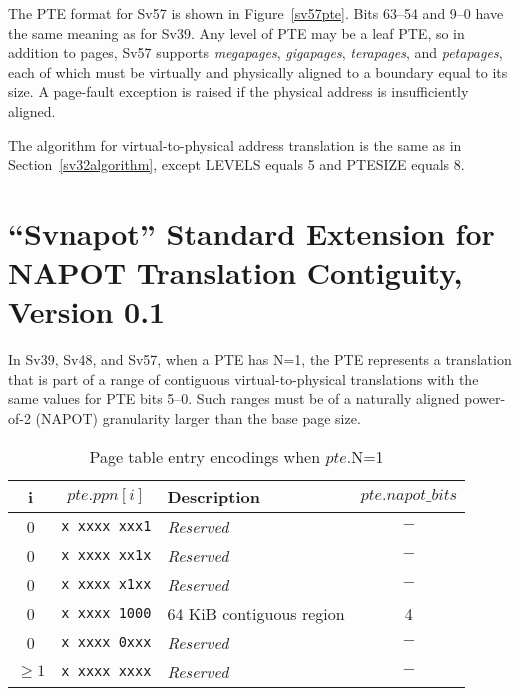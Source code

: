 The PTE format for Sv57 is shown in Figure~\ref{sv57pte}.  Bits 63--54 and 9--0
have the same meaning as for Sv39.  Any level of PTE may be a leaf
PTE, so in addition to  pages, Sv57 supports
 {\em megapages},  {\em gigapages},
 {\em terapages}, and  {\em petapages},
each of which must be virtually and physically aligned to a boundary equal
to its size.  A page-fault exception is raised if the physical address is
insufficiently aligned.

The algorithm for virtual-to-physical address translation is the same
as in Section~\ref{sv32algorithm}, except LEVELS equals 5 and PTESIZE
equals 8.

\chapter{``Svnapot'' Standard Extension for NAPOT Translation Contiguity, Version 0.1}
\label{svnapot}

In Sv39, Sv48, and Sv57, when a PTE has N=1, the PTE represents a
translation that is part of a range of contiguous virtual-to-physical
translations with the same values for PTE bits 5--0.  Such ranges must be of a
naturally aligned power-of-2 (NAPOT) granularity larger than the base page
size.

\begin{table*}[h!]
\begin{center}
\begin{tabular}{|c|c||l|c|}
\hline
i        & $pte.ppn[i]$      & Description              & $pte.napot\_bits$ \\
\hline
0        & {\tt x~xxxx~xxx1} & {\em Reserved}           & $-$ \\
0        & {\tt x~xxxx~xx1x} & {\em Reserved}           & $-$ \\
0        & {\tt x~xxxx~x1xx} & {\em Reserved}           & $-$ \\
0        & {\tt x~xxxx~1000} & 64 KiB contiguous region & 4   \\
0        & {\tt x~xxxx~0xxx} & {\em Reserved}           & $-$ \\
$\geq 1$ & {\tt x~xxxx~xxxx} & {\em Reserved}           & $-$ \\
\hline
\end{tabular}
\end{center}
\caption{Page table entry encodings when $pte$.N=1}
\label{ptenapot}
\end{table*}


